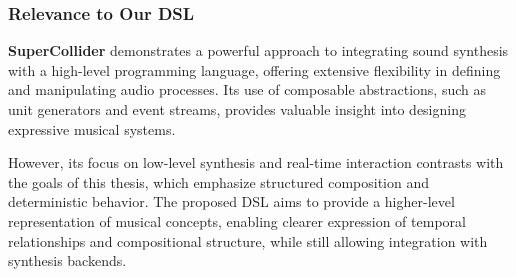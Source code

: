
\subsubsection{Relevance to Our DSL}

\textbf{SuperCollider} demonstrates a powerful approach to integrating sound synthesis with a high-level
programming language, offering extensive flexibility in defining and manipulating audio processes.
Its use of composable abstractions, such as unit generators and event streams, provides valuable insight into designing
expressive musical systems.

However, its focus on low-level synthesis and real-time interaction contrasts with the goals of this thesis,
which emphasize structured composition and deterministic behavior.
The proposed DSL aims to provide a higher-level representation of musical concepts, enabling clearer expression of
temporal relationships and compositional structure, while still allowing integration with synthesis backends.
